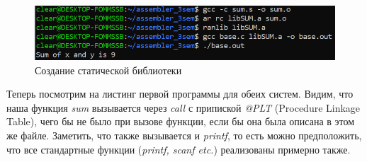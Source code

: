 \documentclass[a4paper,12pt]{article}
\begin{document}
\begin{figure}[H]\label{fig: 32 and 64 func for static library}
\end{figure}

\begin{figure}[H]\label{fig: statLibCreation}
    \centering
    \includegraphics[width = 0.8 \textwidth]{Создание стат библиотеки.png}
    \caption{Создание статической библиотеки}
\end{figure}
Теперь посмотрим на листинг первой программы для обеих систем. Видим, что наша функция \textit{sum} вызывается через \textit{call} с припиской \textit{@PLT} (Procedure Linkage Table), чего бы не было при вызове функции, если бы она была описана в этом же файле. Заметить, что также вызывается и \textit{printf}, то есть можно предположить, что все стандартные функции (\textit{printf, scanf etc.}) реализованы примерно также.
\end{document}
